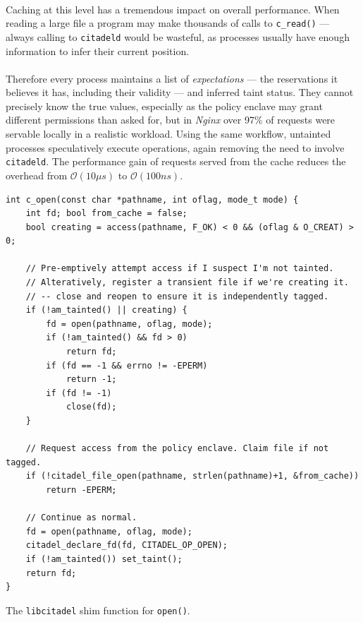 \paragraph{} Caching at this level has a tremendous impact on overall performance. When reading a large file a program may make thousands of calls to \texttt{c\_read()} --- always calling to \texttt{citadeld} would be wasteful, as processes usually have enough information to infer their current position.

\paragraph{} Therefore every process  maintains a list of \textit{expectations} --- the reservations it believes it has, including their validity --- and inferred taint status. They cannot precisely know the true values, especially as the policy enclave may grant different permissions than asked for, but in \textit{Nginx} over 97\% of requests were servable locally in a realistic workload. Using the same workflow, untainted processes speculatively execute operations, again removing the need to involve \texttt{citadeld}. The performance gain of requests served from the cache reduces the overhead from $\mathcal{O}(10\mu s)$ to $\mathcal{O}(100ns)$.


\begin{listing}
\begin{verbatim}
int c_open(const char *pathname, int oflag, mode_t mode) {
    int fd; bool from_cache = false;
    bool creating = access(pathname, F_OK) < 0 && (oflag & O_CREAT) > 0;
    
    // Pre-emptively attempt access if I suspect I'm not tainted.
    // Alteratively, register a transient file if we're creating it.
    // -- close and reopen to ensure it is independently tagged.
    if (!am_tainted() || creating) {
        fd = open(pathname, oflag, mode);
        if (!am_tainted() && fd > 0)
            return fd;
        if (fd == -1 && errno != -EPERM)
            return -1;
        if (fd != -1)
            close(fd);
    }

    // Request access from the policy enclave. Claim file if not tagged.
    if (!citadel_file_open(pathname, strlen(pathname)+1, &from_cache))
        return -EPERM;

    // Continue as normal.
    fd = open(pathname, oflag, mode);
    citadel_declare_fd(fd, CITADEL_OP_OPEN);
    if (!am_tainted()) set_taint();
    return fd;
}
\end{verbatim}
\caption{The \texttt{libcitadel} shim function for \texttt{open()}.}
\label{lst:c_open}
\end{listing}

